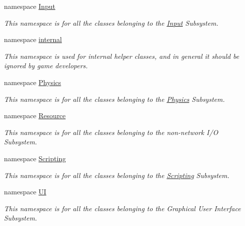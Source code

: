 \begin{DoxyCompactItemize}
namespace \hyperlink{namespaceMezzanine_1_1Input}{Input}
\begin{DoxyCompactList}\small\item\em This namespace is for all the classes belonging to the \hyperlink{namespaceMezzanine_1_1Input}{Input} Subsystem. \end{DoxyCompactList}\item 
namespace \hyperlink{namespaceMezzanine_1_1internal}{internal}
\begin{DoxyCompactList}\small\item\em This namespace is used for internal helper classes, and in general it should be ignored by game developers. \end{DoxyCompactList}\item 
namespace \hyperlink{namespaceMezzanine_1_1Physics}{Physics}
\begin{DoxyCompactList}\small\item\em This namespace is for all the classes belonging to the \hyperlink{namespaceMezzanine_1_1Physics}{Physics} Subsystem. \end{DoxyCompactList}\item 
namespace \hyperlink{namespaceMezzanine_1_1Resource}{Resource}
\begin{DoxyCompactList}\small\item\em This namespace is for all the classes belonging to the non-\/network I/\-O Subsystem. \end{DoxyCompactList}\item 
namespace \hyperlink{namespaceMezzanine_1_1Scripting}{Scripting}
\begin{DoxyCompactList}\small\item\em This namespace is for all the classes belonging to the \hyperlink{namespaceMezzanine_1_1Scripting}{Scripting} Subsystem. \end{DoxyCompactList}\item 
namespace \hyperlink{namespaceMezzanine_1_1UI}{U\-I}
\begin{DoxyCompactList}\small\item\em This namespace is for all the classes belonging to the Graphical User Interface Subsystem. \end{DoxyCompactList}\end{DoxyCompactItemize}
